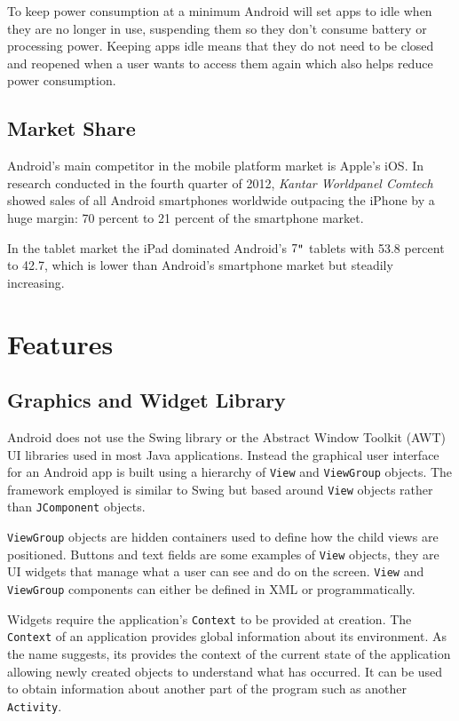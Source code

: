 \documentclass[draft]{report}
\begin{document}
To keep power consumption at a minimum Android will set apps to idle when they are no longer in use, suspending them so they don't consume battery or processing power. Keeping apps idle means that they do not need to be closed and reopened when a user wants to access them again which also helps reduce power consumption.

\subsection{Market Share}

Android's main competitor in the mobile platform market is Apple's iOS. In research conducted in the fourth quarter of 2012, \emph{Kantar Worldpanel Comtech} showed sales of all Android smartphones worldwide outpacing the iPhone by a huge margin: 70 percent to 21 percent of the smartphone market\cite{androidstats}.

In the tablet market the iPad dominated Android's $7\verb+"+$ tablets with 53.8 percent to 42.7, which is lower than Android's smartphone market but steadily increasing\cite{marketshare}.

\section{Features}

\subsection{Graphics and Widget Library}
\label{sub:graphics_and_widgets}

Android does not use the Swing library or the Abstract Window Toolkit (AWT) UI libraries used in most Java applications. Instead the graphical user interface for an Android app is built using a hierarchy of {\tt View} and {\tt ViewGroup} objects. The framework employed is similar to Swing but based around {\tt View} objects rather than {\tt JComponent} objects.

{\tt ViewGroup} objects are hidden containers used to define how the child views are positioned. Buttons and text fields are some examples of {\tt View} objects, they are UI widgets that manage what a user can see and do on the screen. {\tt View} and {\tt ViewGroup} components can either be defined in XML or programmatically.

Widgets require the application's {\tt Context} to be provided at creation. The {\tt Context} of an application provides global information about its environment. As the name suggests, its provides the context of the current state of the application allowing newly created objects to understand what has occurred. It can be used to obtain information about another part of the program such as another {\tt Activity}.
\end{document}
